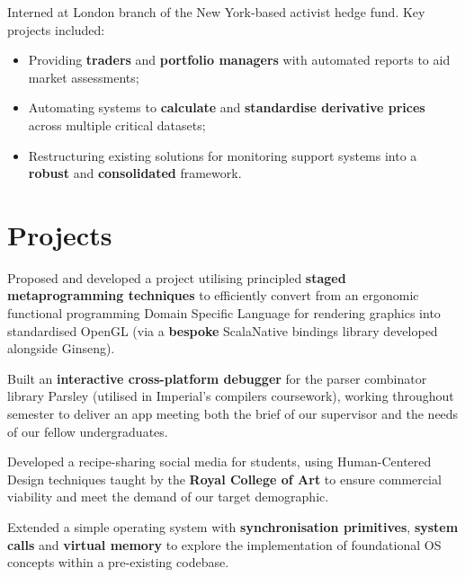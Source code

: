 \documentclass{article}
\begin{document}
Interned at London branch of the New York-based activist hedge fund. Key projects included:
    \begin{itemize}
        \item Providing \textbf{traders} and \textbf{portfolio managers} with automated reports to aid market assessments;
        \item Automating systems to \textbf{calculate} and \textbf{standardise derivative prices} across multiple critical datasets;
        \item Restructuring existing solutions for monitoring support systems into a \textbf{robust} and \textbf{consolidated} framework.
    \end{itemize}

    

\section*{Projects}

{Proposed and developed a project utilising principled \textbf{staged metaprogramming techniques} to efficiently convert from an ergonomic functional programming Domain Specific Language for rendering graphics into standardised OpenGL (via a \textbf{bespoke} ScalaNative bindings library developed alongside Ginseng).}

{Built an \textbf{interactive cross-platform debugger} for the parser combinator library Parsley (utilised in Imperial's compilers coursework), working throughout semester to deliver an app meeting both the brief of our supervisor and the needs of our fellow undergraduates.} 

{Developed a recipe-sharing social media for students, using Human-Centered Design techniques taught by the \textbf{Royal College of Art} to ensure commercial viability and meet the demand of our target demographic.}

{Extended a simple operating system with \textbf{synchronisation primitives}, \textbf{system calls} and \textbf{virtual memory} to explore the implementation of foundational OS concepts within a pre-existing codebase.}
\end{document}
